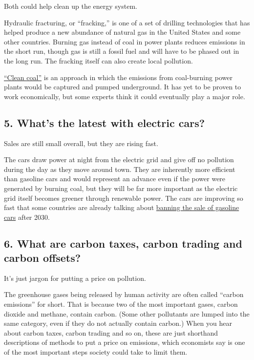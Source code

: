 Both could help clean up the energy system.

Hydraulic fracturing, or ``fracking,'' is one of a set of drilling
technologies that has helped produce a new abundance of natural gas in
the United States and some other countries. Burning gas instead of coal
in power plants reduces emissions in the short run, though gas is still
a fossil fuel and will have to be phased out in the long run. The
fracking itself can also create local pollution.

\href{https://www.nytimes3xbfgragh.onion/2017/08/23/climate/what-clean-coal-is-and-isnt.html}{``Clean
coal''} is an approach in which the emissions from coal-burning power
plants would be captured and pumped underground. It has yet to be proven
to work economically, but some experts think it could eventually play a
major role.

\hypertarget{5-whats-the-latest-with-electric-cars}{%
\subsection{5. What's the latest with electric
cars?}\label{5-whats-the-latest-with-electric-cars}}

Sales are still small overall, but they are rising fast.

The cars draw power at night from the electric grid and give off no
pollution during the day as they move around town. They are inherently
more efficient than gasoline cars and would represent an advance even if
the power were generated by burning coal, but they will be far more
important as the electric grid itself becomes greener through renewable
power. The cars are improving so fast that some countries are already
talking about
\href{https://www.nytimes3xbfgragh.onion/2017/07/06/business/energy-environment/france-cars-ban-gas-diesel.html}{banning
the sale of gasoline cars} after 2030.

\hypertarget{6-what-are-carbon-taxes-carbon-trading-and-carbon-offsets}{%
\subsection{6. What are carbon taxes, carbon trading and carbon
offsets?}\label{6-what-are-carbon-taxes-carbon-trading-and-carbon-offsets}}

It's just jargon for putting a price on pollution.

The greenhouse gases being released by human activity are often called
``carbon emissions'' for short. That is because two of the most
important gases, carbon dioxide and methane, contain carbon. (Some other
pollutants are lumped into the same category, even if they do not
actually contain carbon.) When you hear about carbon taxes, carbon
trading and so on, these are just shorthand descriptions of methods to
put a price on emissions, which economists say is one of the most
important steps society could take to limit them.

